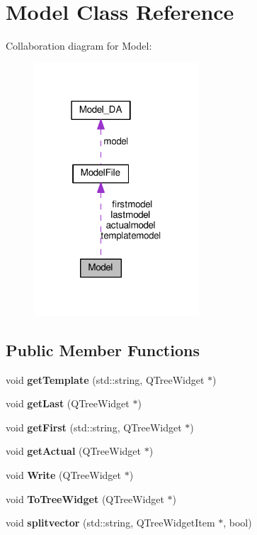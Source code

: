 \section{Model Class Reference}
\label{class_model}


Collaboration diagram for Model\+:\nopagebreak
\begin{figure}[H]
\begin{center}
\leavevmode
\includegraphics[width=175pt]{class_model__coll__graph}
\end{center}
\end{figure}
\subsection*{Public Member Functions}
\begin{DoxyCompactItemize}
\item 
void {\bfseries get\+Template} (std\+::string, Q\+Tree\+Widget $\ast$)\label{class_model_ab54b784192930dc4902485de5b78058d}

\item 
void {\bfseries get\+Last} (Q\+Tree\+Widget $\ast$)\label{class_model_afe731edabf951e61082c9032350f4725}

\item 
void {\bfseries get\+First} (std\+::string, Q\+Tree\+Widget $\ast$)\label{class_model_a1c6147c92b1833c4db5b77e9a1a94819}

\item 
void {\bfseries get\+Actual} (Q\+Tree\+Widget $\ast$)\label{class_model_a6ca2071c0f92df5768b57b1feaf3b170}

\item 
void {\bfseries Write} (Q\+Tree\+Widget $\ast$)\label{class_model_ad9d1d52e7144c52b069ce27c9bfd71e4}

\item 
void {\bfseries To\+Tree\+Widget} (Q\+Tree\+Widget $\ast$)\label{class_model_a6230951e3e7356e8243b169962ecdeff}

\item 
void {\bfseries splitvector} (std\+::string, Q\+Tree\+Widget\+Item $\ast$, bool)\label{class_model_a4e98708626225cc002f9492e94c26561}

\end{DoxyCompactItemize}
